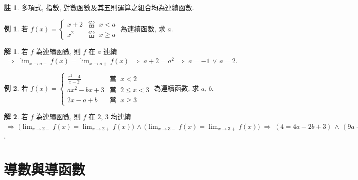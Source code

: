 \documentclass[12pt,a4paper]{extarticle}
\newcommand{\ds}{\displaystyle}
\newcommand{\ie}{\;\Longrightarrow\;}
\theoremstyle{definition}
\newtheorem*{ex}{例}
\newtheorem*{sol}{解}
\newtheorem*{rmk}{註}
\begin{document}
\begin{rmk}
  多項式, 指數, 對數函數及其五則運算之組合均為連續函數. 
\end{rmk}

\begin{ex}
  若 $\ds f(x) = \begin{cases}x + 2 & \text{當 }\; x < a \\ x^2 & \text{當 }\; x\geqslant a\end{cases}$ 為連續函數, 求 $a$. 
\end{ex}

\begin{sol}
  若 $f$ 為連續函數, 則 $f$ 在 $a$ 連續 $\ds\ie \lim_{x\to a-}f(x) = \lim_{x\to a+} f(x) \ie a + 2 = a^2 \ie a = -1\,\vee\, a = 2$. 
\end{sol}

\begin{ex}
  若 $\ds f(x) = \begin{cases}\frac{x^2 - 4}{x - 2} & \text{當 }\; x < 2 \\ a x^2 - b x + 3 & \text{當 }\; 2 \leqslant x < 3 \\ 2 x - a + b & \text{當 }\; x \geqslant 3 \end{cases}$ 為連續函數, 求 $a$, $b$. 
\end{ex}

\begin{sol}
  若 $f$ 為連續函數, 則 $f$ 在 $2$, $3$ 均連續 $\ds\ie \big(\lim_{x\to 2-}f(x) = \lim_{x\to 2+} f(x)\big) \,\wedge\, \big(\lim_{x\to 3-}f(x) = \lim_{x\to 3+} f(x)\big)\ie (4 = 4a - 2b + 3)\,\wedge\, (9a - 3b + 3 = 6 - a + b)\ie a = \frac{1}{2},\,\,b = \frac{1}{2}$. 
\end{sol}

\section*{導數與導函數}
\end{document}
